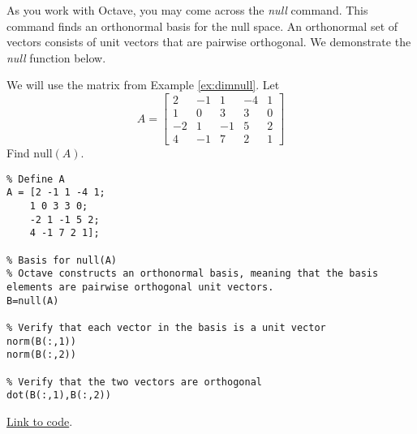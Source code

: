 \documentclass{ximera}
\begin{document}
As you work with Octave, you may come across the \emph{null} command.  This command finds an orthonormal basis for the null space.  An orthonormal set of vectors consists of unit vectors that are pairwise orthogonal.  We demonstrate the \emph{null} function below.

\begin{template}
    We will use the matrix from Example \ref{ex:dimnull}.  Let 
$$A=\begin{bmatrix}2&-1&1&-4&1\\1&0&3&3&0\\-2&1&-1&5&2\\4&-1&7&2&1\end{bmatrix}$$
Find $\mbox{null}(A)$.

\begin{verbatim}
% Define A
A = [2 -1 1 -4 1;
    1 0 3 3 0;
    -2 1 -1 5 2;
    4 -1 7 2 1];

% Basis for null(A)
% Octave constructs an orthonormal basis, meaning that the basis elements are pairwise orthogonal unit vectors.
B=null(A)

% Verify that each vector in the basis is a unit vector
norm(B(:,1))
norm(B(:,2))

% Verify that the two vectors are orthogonal
dot(B(:,1),B(:,2))
\end{verbatim}

\href{https://sagecell.sagemath.org/?z=eJxtjkFLxDAUhO-B_Ie5LLTQyqauLCh7aPHuzYt4iPV1G2hfJEl38d-b2Kg9mITAm2S-mR0eaTBMaKVoccJLg1pBoT5APUiBuBT2uI17n-e6Se8Kd2iyckjjEVF_jYoUO3TaG4_BOvAyTUVbJvGpD_pC6C374JY-eGiGdWG0bN2sJ7wlV4WZNBs-I4w6xItWHTTRTJxcjvChjbsaT6v_bDnaFzYBF-qDdf5Giu70m53Sn8mZ4XOFku7H_BOGNxnx6C1HilSt6Ir7SpXlZmrKf7CJE672p8N30b9-UrzbkFFVZnwBTjpvrw==&lang=octave&interacts=eJyLjgUAARUAuQ==}{Link to code}.
\end{template}
\end{document}
